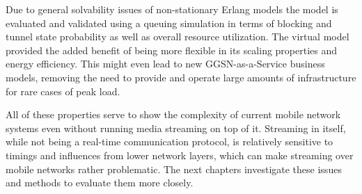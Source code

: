 Due to general solvability issues of non-stationary Erlang models the model is evaluated and validated using a queuing simulation in terms of blocking and tunnel state probability as well as overall resource utilization. The virtual model provided the added benefit of being more flexible in its scaling properties and energy efficiency. This might even lead to new \gls{GGSN}-as-a-Service business models, removing the need to provide and operate large amounts of infrastructure for rare cases of peak load. 

All of these properties serve to show the complexity of current mobile network systems even without running media streaming on top of it. Streaming in itself, while not being a real-time communication protocol, is relatively sensitive to timings and influences from lower network layers, which can make streaming over mobile networks rather problematic. The next chapters investigate these issues and methods to evaluate them more closely.




